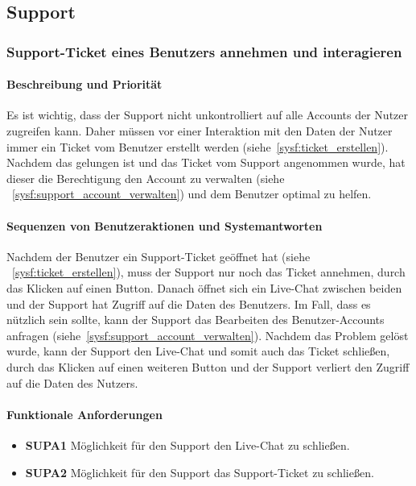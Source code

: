 
\subsection{Support}
\subsubsection{Support-Ticket eines Benutzers annehmen und \label{sysf:ticket_annehmen}
	interagieren}
\paragraph{Beschreibung und Priorität}
Es ist wichtig, dass der Support nicht unkontrolliert auf alle Accounts der Nutzer zugreifen kann.
Daher müssen vor einer Interaktion mit den Daten der Nutzer immer ein Ticket vom Benutzer erstellt werden (siehe~\ref{sysf:ticket_erstellen}).
Nachdem das gelungen ist und das Ticket vom Support angenommen wurde, hat dieser die Berechtigung
den Account zu verwalten (siehe ~\ref{sysf:support_account_verwalten}) und dem Benutzer optimal zu helfen.
\paragraph{Sequenzen von Benutzeraktionen und Systemantworten}
Nachdem der Benutzer ein Support-Ticket geöffnet hat (siehe ~\ref{sysf:ticket_erstellen}), muss der Support
nur noch das Ticket annehmen, durch das Klicken auf einen Button.
Danach öffnet sich ein Live-Chat zwischen beiden und der Support hat Zugriff auf die Daten des Benutzers.
Im Fall, dass es nützlich sein sollte, kann der Support das Bearbeiten des Benutzer-Accounts anfragen (siehe~\ref{sysf:support_account_verwalten}).
Nachdem das Problem gelöst wurde, kann der Support den Live-Chat und somit auch das Ticket schließen,
durch das Klicken auf einen weiteren Button
und der Support verliert den Zugriff auf die Daten des Nutzers.
\paragraph{Funktionale Anforderungen}
\begin{itemize}
	\item \textbf{SUPA1} Möglichkeit für den Support den Live-Chat zu schließen.
	\item \textbf{SUPA2} Möglichkeit für den Support das Support-Ticket zu schließen.
\end{itemize}

